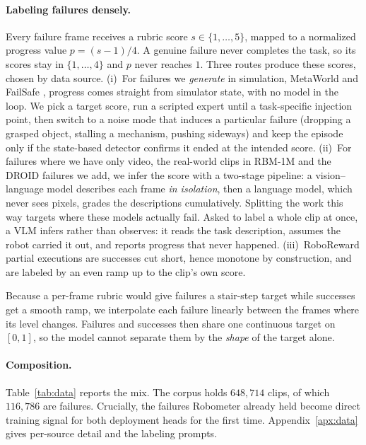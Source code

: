 \paragraph{Labeling failures densely.}
Every failure frame receives a rubric score $s \in \{1,\dots,5\}$, mapped to a
normalized progress value $p = (s-1)/4$. A genuine failure never completes the
task, so its scores stay in $\{1,\dots,4\}$ and $p$ never reaches $1$. Three
routes produce these scores, chosen by data source. (i)~For failures we
\emph{generate} in simulation, MetaWorld \citep{yu_meta-world_2019,
mclean_meta-world_2025} and FailSafe \citep{lin_failsafe_2025}, progress comes
straight from simulator state, with no model in the loop. We pick a target score,
run a scripted expert until a task-specific injection point, then switch to a
noise mode that induces a particular failure (dropping a grasped object, stalling
a mechanism, pushing sideways) and keep the episode only if the state-based
detector confirms it ended at the intended score. (ii)~For failures where we have
only video, the real-world clips in RBM-1M and the DROID
\citep{khazatsky_droid_2024} failures we add, we infer the score with a two-stage
pipeline: a vision--language model describes each frame \emph{in isolation}, then
a language model, which never sees pixels, grades the descriptions cumulatively.
Splitting the work this way targets where these models actually fail. Asked to
label a whole clip at once, a VLM infers rather than observes: it reads the task
description, assumes the robot carried it out, and reports progress that never
happened. (iii)~RoboReward \citep{roboreward} partial executions are successes cut
short, hence monotone by construction, and are labeled by an even ramp up to the
clip's own score.

Because a per-frame rubric would give failures a stair-step target while
successes get a smooth ramp, we interpolate each failure linearly between the
frames where its level changes. Failures and successes then share one continuous
target on $[0,1]$, so the model cannot separate them by the \emph{shape} of the
target alone.

\paragraph{Composition.}
Table~\ref{tab:data} reports the mix. The corpus holds $648{,}714$ clips, of
which $116{,}786$ are failures. Crucially, the failures Robometer already held
become direct training signal for both deployment heads for the first time.
Appendix~\ref{apx:data} gives per-source detail and the labeling prompts.

